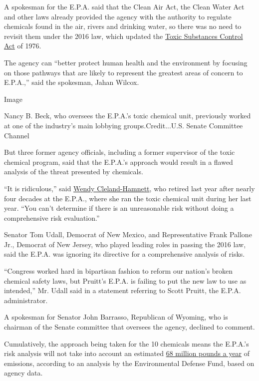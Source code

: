 A spokesman for the E.P.A. said that the Clean Air Act, the Clean Water
Act and other laws already provided the agency with the authority to
regulate chemicals found in the air, rivers and drinking water, so there
was no need to revisit them under the 2016 law, which updated the
\href{https://www.epa.gov/laws-regulations/summary-toxic-substances-control-act}{Toxic
Substances Control Act} of 1976.

The agency can ``better protect human health and the environment by
focusing on those pathways that are likely to represent the greatest
areas of concern to E.P.A.,'' said the spokesman, Jahan Wilcox.

Image

Nancy B. Beck, who oversees the E.P.A.'s toxic chemical unit, previously
worked at one of the industry's main lobbying groups.Credit...U.S.
Senate Committee Channel

But three former agency officials, including a former supervisor of the
toxic chemical program, said that the E.P.A.'s approach would result in
a flawed analysis of the threat presented by chemicals.

``It is ridiculous,'' said
\href{https://19january2017snapshot.epa.gov/aboutepa/wendy-cleland-hamnett-principal-deputy-assistant-administrator-office-chemical-safety-and_.html}{Wendy
Cleland-Hamnett}, who retired last year after nearly four decades at the
E.P.A., where she ran the toxic chemical unit during her last year.
``You can't determine if there is an unreasonable risk without doing a
comprehensive risk evaluation.''

Senator Tom Udall, Democrat of New Mexico, and Representative Frank
Pallone Jr., Democrat of New Jersey, who played leading roles in passing
the 2016 law, said the E.P.A. was ignoring its directive for a
comprehensive analysis of risks.

``Congress worked hard in bipartisan fashion to reform our nation's
broken chemical safety laws, but Pruitt's E.P.A. is failing to put the
new law to use as intended,'' Mr. Udall said in a statement referring to
Scott Pruitt, the E.P.A. administrator.

A spokesman for Senator John Barrasso, Republican of Wyoming, who is
chairman of the Senate committee that oversees the agency, declined to
comment.

Cumulatively, the approach being taken for the 10 chemicals means the
E.P.A.'s risk analysis will not take into account an estimated
\href{http://blogs.edf.org/health/files/2018/06/First-Ten-Emissions-TRI.pdf}{68
million pounds a year} of emissions, according to an analysis by the
Environmental Defense Fund, based on agency data.

